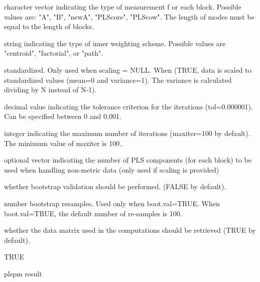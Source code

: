 \documentclass[a4paper]{book}
\begin{document}
\begin{Arguments}
\begin{ldescription}
\item[\code{scaling}] character vector indicating the type of measurement f
or each block. Possible values are: "A", "B", "newA", "PLScore",
"PLScow". The length of modes must be equal to the length of blocks.

\item[\code{scheme}] string indicating the type of inner weighting scheme.
Possible values are "centroid", "factorial", or "path".

\item[\code{scaled}] standardized. Only used when scaling = NULL.
When (TRUE, data is scaled to standardized values (mean=0 and variance=1).
The variance is calculated dividing by N instead of N-1).

\item[\code{tol}] decimal value indicating the tolerance criterion
for the iterations (tol=0.000001). Can be specified between 0 and 0.001.

\item[\code{maxiter}] integer indicating the maximum number of iterations
(maxiter=100 by default). The minimum value of maxiter is 100.

\item[\code{plscomp}] optional vector indicating the number of PLS components
(for each block) to be used when handling non-metric data
(only used if scaling is provided)

\item[\code{boot.val}] whether bootstrap validation should be performed.
(FALSE by default).

\item[\code{br}] number bootstrap resamples. Used only when boot.val=TRUE. When boot.val=TRUE, the default number of re-samples is 100.

\item[\code{dataset}] whether the data matrix used in the computations should be retrieved (TRUE by default).

\item[\code{summary}] TRUE
\end{ldescription}
\end{Arguments}
%
\begin{Value}
plspm result
\end{Value}
%
\end{document}
